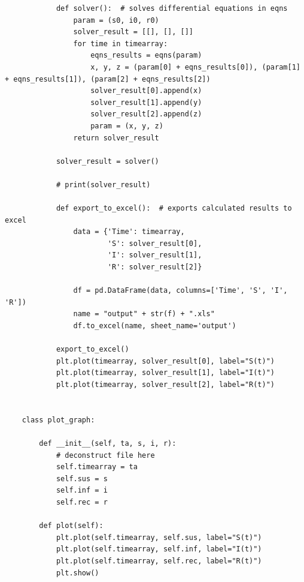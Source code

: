 \documentclass[11pt, a4paper]{article}
\begin{document}
\begin{lstlisting}
            def solver():  # solves differential equations in eqns
                param = (s0, i0, r0)
                solver_result = [[], [], []]
                for time in timearray:
                    eqns_results = eqns(param)
                    x, y, z = (param[0] + eqns_results[0]), (param[1] + eqns_results[1]), (param[2] + eqns_results[2])
                    solver_result[0].append(x)
                    solver_result[1].append(y)
                    solver_result[2].append(z)
                    param = (x, y, z)
                return solver_result
    
            solver_result = solver()
    
            # print(solver_result)
    
            def export_to_excel():  # exports calculated results to excel
                data = {'Time': timearray,
                        'S': solver_result[0],
                        'I': solver_result[1],
                        'R': solver_result[2]}
    
                df = pd.DataFrame(data, columns=['Time', 'S', 'I', 'R'])
                name = "output" + str(f) + ".xls"
                df.to_excel(name, sheet_name='output')
    
            export_to_excel()
            plt.plot(timearray, solver_result[0], label="S(t)")
            plt.plot(timearray, solver_result[1], label="I(t)")
            plt.plot(timearray, solver_result[2], label="R(t)")
    
    
    class plot_graph:
    
        def __init__(self, ta, s, i, r):
            # deconstruct file here
            self.timearray = ta
            self.sus = s
            self.inf = i
            self.rec = r
    
        def plot(self):
            plt.plot(self.timearray, self.sus, label="S(t)")
            plt.plot(self.timearray, self.inf, label="I(t)")
            plt.plot(self.timearray, self.rec, label="R(t)")
            plt.show()
    
\end{lstlisting}
\end{document}
